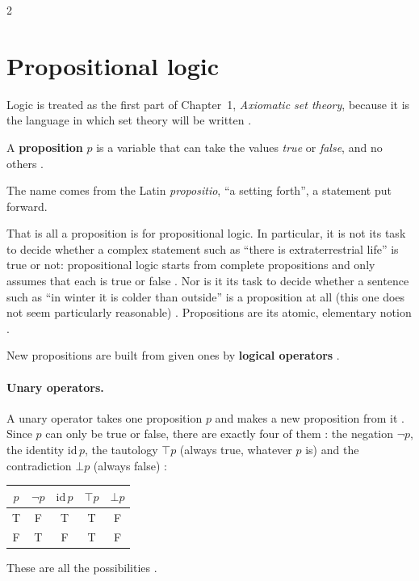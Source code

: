 \begin{paracol}{2}
\section{Propositional logic}\label{sec:lo-prop}

Logic is treated as the first part of Chapter~1, \emph{Axiomatic set theory}, because it is the language
in which set theory will be written .

\begin{definition}\label{def:lo-proposition}
A \textbf{proposition} $p$ is a variable that can take the values \emph{true} or \emph{false}, and no others
.
\end{definition}
The name comes from the Latin \emph{propositio}, ``a setting forth'', a statement put forward.

That is all a proposition is for propositional logic. In particular, it is not its task to decide whether a
complex statement such as ``there is extraterrestrial life'' is true or not: propositional logic starts from
complete propositions and only assumes that each is true or false . Nor is it its task to
decide whether a sentence such as ``in winter it is colder than outside'' is a proposition at all (this one does
not seem particularly reasonable) . Propositions are its atomic, elementary notion
.

New propositions are built from given ones by \textbf{logical operators} .

\paragraph{Unary operators.} A unary operator takes one proposition $p$ and makes a new proposition from it
. Since $p$ can only be true or false, there are exactly four of them : the
negation $\neg p$, the identity $\mathrm{id}\,p$, the tautology $\top p$ (always true, whatever $p$ is) and the
contradiction $\bot p$ (always false) :
\begin{center}
\renewcommand{\arraystretch}{1.35}
\begin{tabular}{c|cccc}
$p$ & $\neg p$ & $\mathrm{id}\,p$ & $\top p$ & $\bot p$\\\hline
T & F & T & T & F\\
F & T & F & T & F
\end{tabular}
\end{center}
These are all the possibilities .


\end{paracol}
